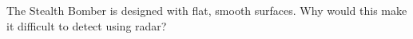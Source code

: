The Stealth Bomber is designed with flat, smooth
surfaces. Why would this make it difficult to detect using radar?
